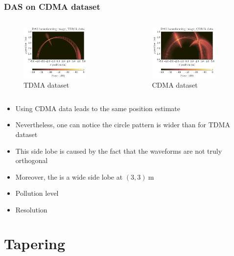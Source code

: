 \documentclass[UKenglish,8pt,aspectratio=1610]{beamer}
\begin{document}
\begin{frame}
	\frametitle{DAS on CDMA dataset}
\begin{columns}
	\begin{column}{0.5\textwidth}
		\begin{figure}[h!]
			\includegraphics[width=0.8\textwidth]{question3/TDMA_DAS_image.pdf}
			\centering
			\caption{TDMA dataset}
		\end{figure}
	\end{column}
	\begin{column}{0.5\textwidth}
		\begin{figure}[h!]
			\includegraphics[width=0.8\textwidth]{question3/CDMA_DAS_image.pdf}
			\centering
			\caption{CDMA dataset}
		\end{figure}
	\end{column}
\end{columns}
\begin{itemize}
	\item Using CDMA data leads to the same position estimate
	\item Nevertheless, one can notice the circle pattern is wider than for TDMA dataset
	\item This side lobe is caused by the fact that the waveforms are not truly orthogonal
	\item Moreover, the is a wide side lobe at $(3,3)~\si{\meter}$
	\item Pollution level
	\item Resolution
\end{itemize}
\end{frame}

\section{Tapering}
\begin{frame}

\end{frame}

		
	
\end{document}

